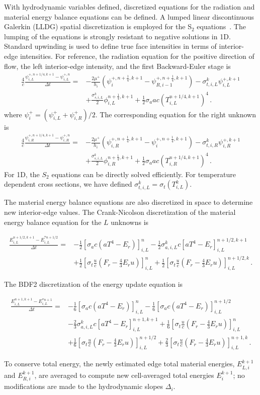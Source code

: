\documentclass[preprint,12pt]{elsarticle}
\newcommand{\fn}[1]{\left( #1 \right)}
\newcommand{\pep}{\, .}
\newcommand{\lequ}[1]{\label{eq:#1}}
\newcommand{\half}{\frac{1}{2}}
\newcommand{\fourth}{\frac{1}{4}}
\newcommand{\sixth}{\frac{1}{6}}
\newcommand{\E}{{E_r}}
\newcommand{\F}{{F_r}}
\newcommand{\dt}{\Delta t}
\newcommand{\iL}{_{i,L}}
\newcommand{\iR}{_{i,R}}
\newcommand{\energyEmissionSource}{
   \left[\sigma_a c\left(aT^4 - \E\right)\right]
}
\newcommand{\energyEmissionSourceNew}{
   \sigma_{a,i,L}^k c\left[aT^4 - \E\right]
}
\newcommand{\energyDriftSource}{
   \left[\sigma_t\frac{u}{c}\left(\F-\frac{4}{3}\E u\right)\right]
}
\newcommand{\energyUpdateCN}[5]{
\begin{equation}\begin{split}
        \frac{E^{#4,k+1}#3-E^{*#4}#3}{#2\dt} = &
  -\half\energyEmissionSource^{#1}#3
  -\half\energyEmissionSourceNew^{#4,k+1}#3\\
  &+\half\energyDriftSource^{#1}#3
  +\half\energyDriftSource^{#4,k}#3
  \pep
#5
\end{split}\end{equation}
}
\newcommand{\energyUpdateBDFTwo}[6]{
    \begin{equation}\begin{split}
        \frac{E^{#5,k+1}#4-E^{*#5}#4}{#3\dt} = &
  -\sixth\energyEmissionSource^{#1}#4
  -\sixth\energyEmissionSource^{#2}#4\\
  &-\frac{2}{3}\energyEmissionSourceNew^{#5,k+1}#4
   +\sixth\energyDriftSource^{#1}#4\\
  &+\sixth\energyDriftSource^{#2}#4
  +\frac{2}{3}\energyDriftSource^{#5,k}#4
  \pep
#6
\end{split}\end{equation}
}
\begin{document}
With hydrodynamic variables defined, discretized equations for the radiation and material
energy balance equations can be defined.
A lumped linear discontinuous Galerkin (LLDG) spatial discretization is employed
for the S$_2$ equations~\cite{morelldsn}.  The lumping of the equations is strongly resistant 
to negative solutions in 1D. Standard upwinding is used to define true face intensities in terms of interior-edge
intensities.
For reference, the radiation equation for
the positive direction of flow, the left interior-edge intensity, and the first Backward-Euler stage is
\begin{equation}
\lequ{S2BEfullL}\begin{split}
  \frac{4}{c}\frac{\psi\iL^{+,n+1/4,k+1}-\psi\iL^{+,n}}{\dt} = &
  -\frac{2\mu^+}{h_i}\fn{\psi^{+,n+\fourth,k+1}_i - \psi^{+,n+\fourth,k+1}_{R,i-1}}
   -\sigma_{t,i,L}^k\psi\iL^{+,k+1}\\
   & +\frac{\sigma_{s,i,L}^k}{2}\phi\iL^{n+\fourth,k+1} +\half\sigma_a a c
   \left(T_{i,L}^{n+1/4,k+1}\right)^4
   \pep
\end{split}
\end{equation}
where $\psi_{i}^+ = (\psi_{i,L}^+ + \psi_{i,R}^+)/2$.  The corresponding equation
for the right unknown is
\begin{equation}
    \lequ{S2BEfullR}\begin{split}
  \frac{4}{c}\frac{\psi\iR^{+,n+1/4,k+1}-\psi\iR^{+,n}}{\dt} = &
  -\frac{2\mu^+}{h_i}\fn{\psi^{+,n+\fourth,k+1}_{i,R} - \psi^{+,n+\fourth,k+1}_{i}}
   -\sigma_{t,i,R}^k\psi\iR^{+,k+1}\\
   & +\frac{\sigma_{s,i,L}^k}{2}\phi\iR^{n+\fourth,k+1} +\half\sigma_a a c
   \left(T_{i,R}^{n+1/4,k+1}\right)^4
   \pep
\end{split}
\end{equation}
For 1D, the $S_2$ equations can be
directly solved efficiently.  For temperature dependent cross sections, we have defined
$\sigma_{t,i,L}^k=\sigma_{t}(T_{i,L}^k)$.

The material energy balance equations are also discretized in space to determine new
interior-edge
values. 
The Crank-Nicolson discretization of the material energy balance equation for the $L$
unknowns is
\energyUpdateCN{n}{}{\iL}{n+1/2}{\lequ{hydroECNfull}}
The BDF2 discretization of the energy update equation is
\energyUpdateBDFTwo{n}{n+1/2}{}{\iL}{n+1}{\lequ{hydroEBDF2full}}
To conserve total energy, the newly estimated edge total
material energies, $E_{L,i}^{k+1}$ and $E_{R,i}^{k+1}$, are averaged to compute new
cell-averaged total energies $E_{i}^{k+1}$; no modifications are made to the hydrodynamic slopes
$\Delta_i$.  
\end{document}

